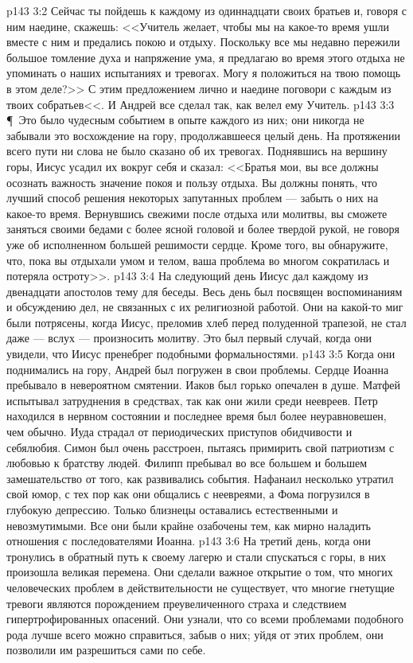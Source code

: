 \vs p143 3:2 Сейчас ты пойдешь к каждому из одиннадцати своих братьев и, говоря с ним наедине, скажешь: <<Учитель желает, чтобы мы на какое\hyp{}то время ушли вместе с ним и предались покою и отдыху. Поскольку все мы недавно пережили большое томление духа и напряжение ума, я предлагаю во время этого отдыха не упоминать о наших испытаниях и тревогах. Могу я положиться на твою помощь в этом деле?>> С этим предложением лично и наедине поговори с каждым из твоих собратьев<<. И Андрей все сделал так, как велел ему Учитель.
\vs p143 3:3 \P\ Это было чудесным событием в опыте каждого из них; они никогда не забывали это восхождение на гору, продолжавшееся целый день. На протяжении всего пути ни слова не было сказано об их тревогах. Поднявшись на вершину горы, Иисус усадил их вокруг себя и сказал: <<Братья мои, вы все должны осознать важность значение покоя и пользу отдыха. Вы должны понять, что лучший способ решения некоторых запутанных проблем --- забыть о них на какое\hyp{}то время. Вернувшись свежими после отдыха или молитвы, вы сможете заняться своими бедами с более ясной головой и более твердой рукой, не говоря уже об исполненном большей решимости сердце. Кроме того, вы обнаружите, что, пока вы отдыхали умом и телом, ваша проблема во многом сократилась и потеряла остроту>>.
\vs p143 3:4 На следующий день Иисус дал каждому из двенадцати апостолов тему для беседы. Весь день был посвящен воспоминаниям и обсуждению дел, не связанных с их религиозной работой. Они на какой\hyp{}то миг были потрясены, когда Иисус, преломив хлеб перед полуденной трапезой, не стал даже --- вслух --- произносить молитву. Это был первый случай, когда они увидели, что Иисус пренебрег подобными формальностями.
\vs p143 3:5 Когда они поднимались на гору, Андрей был погружен в свои проблемы. Сердце Иоанна пребывало в невероятном смятении. Иаков был горько опечален в душе. Матфей испытывал затруднения в средствах, так как они жили среди неевреев. Петр находился в нервном состоянии и последнее время был более неуравновешен, чем обычно. Иуда страдал от периодических приступов обидчивости и себялюбия. Симон был очень расстроен, пытаясь примирить свой патриотизм с любовью к братству людей. Филипп пребывал во все большем и большем замешательство от того, как развивались события. Нафанаил несколько утратил свой юмор, с тех пор как они общались с неевреями, а Фома погрузился в глубокую депрессию. Только близнецы оставались естественными и невозмутимыми. Все они были крайне озабочены тем, как мирно наладить отношения с последователями Иоанна.
\vs p143 3:6 На третий день, когда они тронулись в обратный путь к своему лагерю и стали спускаться с горы, в них произошла великая перемена. Они сделали важное открытие о том, что многих человеческих проблем в действительности не существует, что многие гнетущие тревоги являются порождением преувеличенного страха и следствием гипертрофированных опасений. Они узнали, что со всеми проблемами подобного рода лучше всего можно справиться, забыв о них; уйдя от этих проблем, они позволили им разрешиться сами по себе.
